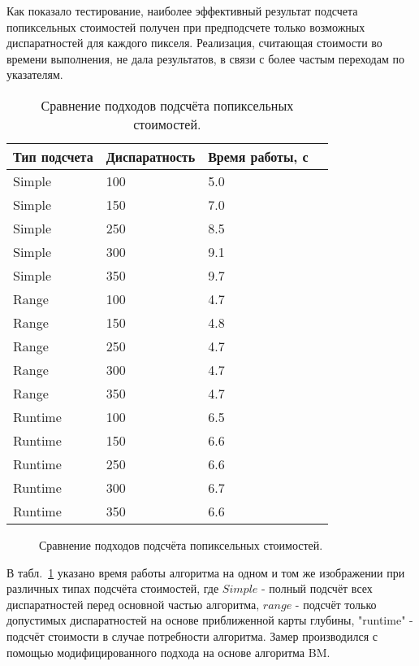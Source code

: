  Как показало тестирование, наиболее эффективный результат подсчета попиксельных стоимостей получен при предподсчете только возможных диспаратностей для каждого пикселя. Реализация, считающая стоимости во времени выполнения, не дала результатов, в связи с более частым переходам по указателям. 
\begin{table}[h!]
   \caption{Сравнение подходов подсчёта попиксельных стоимостей.}
    \label{1}
    \begin{tabular}{ | l | l | l | p{5cm} |}
    \hline
    Тип подсчета & Диспаратность & Время работы, с \\ \hline
   
    Simple & 100 & 5.0   \\ \hline
    Simple & 150 & 7.0   \\ \hline
    Simple & 250 & 8.5   \\ \hline
    Simple & 300 & 9.1  \\ \hline
    Simple & 350 & 9.7   \\ \hline
    Range & 100 & 4.7   \\ \hline
    Range & 150 & 4.8  \\ \hline
    Range & 250 & 4.7   \\ \hline
    Range & 300 & 4.7  \\ \hline
    Range & 350 & 4.7   \\ \hline
    Runtime & 100 & 6.5   \\ \hline
    Runtime & 150 & 6.6  \\ \hline
    Runtime & 250 & 6.6   \\ \hline
    Runtime & 300 & 6.7  \\ \hline
    Runtime & 350 & 6.6   \\ 
    \hline
    \end{tabular}
\end{table}

\begin{figure}[h!]
\caption{Сравнение подходов подсчёта попиксельных стоимостей.}
\label{3}
\end{figure}

В табл.~\ref{1} указано время работы алгоритма на одном и том же изображении при различных типах подсчёта стоимостей, где $Simple$ - полный подсчёт всех диспаратностей перед основной частью алгоритма, $range$ - подсчёт только допустимых диспаратностей на основе приближенной карты глубины, "runtime" - подсчёт стоимости в случае потребности алгоритма. Замер производился с помощью модифицированного подхода на основе алгоритма BM. 

